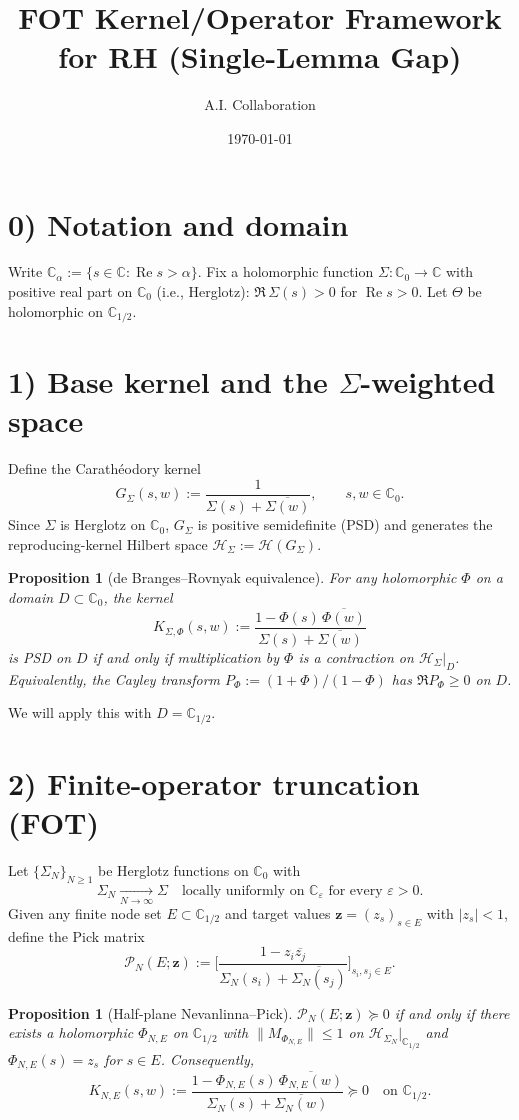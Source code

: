 \documentclass[11pt]{article}
\title{FOT Kernel/Operator Framework for RH (Single-Lemma Gap)}
\author{A.I. Collaboration}
\date{\today}
\newcommand{\C}{\mathbb{C}}
\newcommand{\ReS}{\operatorname{Re}}
\newcommand{\Si}{\Sigma}
\newcommand{\SiN}{\Sigma_N}
\newcommand{\Th}{\Theta}
\theoremstyle{plain}
\newtheorem{proposition}[theorem]{Proposition}
\theoremstyle{definition}
\theoremstyle{remark}
\begin{document}
\maketitle

\section*{0) Notation and domain}
Write $\C_\alpha:=\{ s\in\C : \ReS s>\alpha\}$. Fix a holomorphic function $\Si: \C_{0}\to\C$ with positive real part on $\C_0$ (i.e., Herglotz): $\Re\,\Si(s)>0$ for $\ReS s>0$. Let $\Th$ be holomorphic on $\C_{1/2}$.

\section*{1) Base kernel and the $\Si$-weighted space}
Define the Carath\'eodory kernel
\[
G_{\Si}(s,w):=\frac{1}{\Si(s)+\overline{\Si(w)}}, \qquad s,w\in\C_0.
\]
Since $\Si$ is Herglotz on $\C_0$, $G_\Si$ is positive semidefinite (PSD) and generates the reproducing-kernel Hilbert space $\mathscr H_\Si:=\mathscr H(G_\Si)$.

\begin{proposition}[de Branges--Rovnyak equivalence]\label{prop:dBR}
For any holomorphic $\Phi$ on a domain $D\subset \C_0$, the kernel
\[
K_{\Si,\Phi}(s,w):=\frac{1-\Phi(s)\,\overline{\Phi(w)}}{\Si(s)+\overline{\Si(w)}}
\]
is PSD on $D$ if and only if multiplication by $\Phi$ is a contraction on $\mathscr H_\Si|_D$. Equivalently, the Cayley transform $P_\Phi:=(1+\Phi)/(1-\Phi)$ has $\Re P_\Phi\ge0$ on $D$.
\end{proposition}

We will apply this with $D=\C_{1/2}$.

\section*{2) Finite-operator truncation (FOT)}
Let $\{\SiN\}_{N\ge1}$ be Herglotz functions on $\C_0$ with
\[
\SiN \xrightarrow[N\to\infty]{} \Si \quad\text{locally uniformly on } \C_\varepsilon \text{ for every }\varepsilon>0.
\]
Given any finite node set $E\subset \C_{1/2}$ and target values $\mathbf z=(z_s)_{s\in E}$ with $|z_s|<1$, define the Pick matrix
\[
\mathcal P_N(E;\mathbf z):=\Bigg[ \frac{1-z_i\overline{z_j}}{\SiN(s_i)+\overline{\SiN(s_j)}} \Bigg]_{s_i,s_j\in E}.
\]

\begin{proposition}[Half-plane Nevanlinna--Pick]
$\mathcal P_N(E;\mathbf z)\succeq0$ if and only if there exists a holomorphic $\Phi_{N,E}$ on $\C_{1/2}$ with $\|M_{\Phi_{N,E}}\|\le1$ on $\mathscr H_{\SiN}|_{\C_{1/2}}$ and $\Phi_{N,E}(s)=z_s$ for $s\in E$. Consequently,
\[
K_{N,E}(s,w):=\frac{1-\Phi_{N,E}(s)\,\overline{\Phi_{N,E}(w)}}{\SiN(s)+\overline{\SiN(w)}}\succeq0 \quad\text{on }\C_{1/2}.
\]
\end{proposition}
\end{document}
